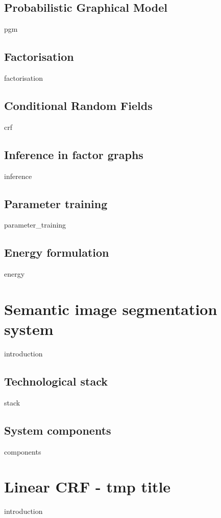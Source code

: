 \documentclass[12pt]{report}
\begin{document}
\section{Probabilistic Graphical Model}
{pgm}

\section{Factorisation}
{factorisation}

\section{Conditional Random Fields }
{crf}
	
\section{Inference in factor graphs}
\label{sec:inference}
{inference}

\section{Parameter training }
{parameter_training}

\section{Energy formulation}	
\label{sec:energy}
{energy}


\chapter{Semantic image segmentation system}
{introduction}

\section{Technological stack}	
{stack}

\section{System components}	
{components}


\chapter{Linear CRF - tmp title}
\label{chapter:linear}
{introduction}
\end{document}
